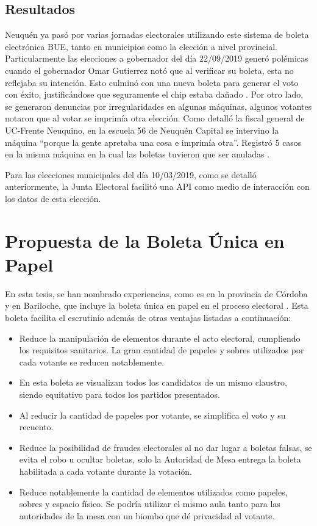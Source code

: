 \section{Resultados}
Neuquén ya pasó por varias jornadas electorales utilizando este sistema de boleta electrónica BUE, tanto en municipios como la elección a nivel provincial. Particularmente las elecciones a gobernador del día 22/09/2019 generó polémicas cuando el gobernador Omar Gutierrez notó que al verificar su boleta, esta no reflejaba su intención. Esto culminó con una nueva boleta para generar el voto con éxito, justificándose que seguramente el chip estaba dañado \cite{errorOmarGutierrez}.  Por otro lado, se generaron denuncias por irregularidades en algunas máquinas, algunos votantes notaron que al votar se imprimía otra elección. Como detalló la fiscal general de UC-Frente Neuquino, en la escuela 56 de Neuquén Capital se intervino la máquina ``porque la gente apretaba una cosa e imprimía otra''. Registró 5 casos en la misma máquina en la cual las boletas tuvieron que ser anuladas \cite{errorNeuquen}. 

Para las elecciones municipales del día 10/03/2019, como se detalló anteriormente, la Junta Electoral facilitó una API como medio de interacción con los datos de esta elección. 


\chapter{Propuesta de la Boleta Única en Papel}
\label{BU}
En esta tesis, se han nombrado experiencias, como es en la provincia de Córdoba y en Bariloche, que incluye la boleta única en papel en el proceso electoral \cite{reglamentoBU}. Esta boleta facilita el escrutinio además de otras ventajas listadas a continuación:
\begin{itemize}
    \item Reduce la manipulación de elementos durante el acto electoral, cumpliendo los requisitos sanitarios. La gran cantidad de papeles y sobres utilizados por cada votante se reducen notablemente. 
    \item En esta boleta se visualizan todos los candidatos de un mismo claustro, siendo equitativo para todos los partidos presentados.
    \item Al reducir la cantidad de papeles por votante, se simplifica el voto y su recuento.
    \item Reduce la posibilidad de fraudes electorales al no dar lugar a boletas falsas, se evita el robo u ocultar boletas, solo la Autoridad de Mesa entrega la boleta habilitada a cada votante durante la votación.
    \item Reduce notablemente la cantidad de elementos utilizados como papeles, sobres y espacio físico. Se podría utilizar el mismo aula tanto para las autoridades de la mesa con un biombo que dé privacidad al votante.
\end{itemize}

